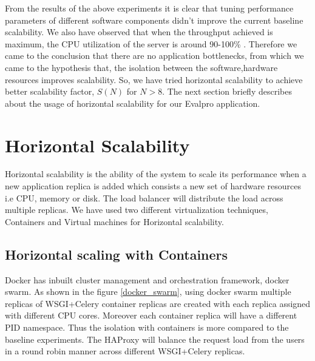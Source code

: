 \documentclass[sigconf]{acmart}
\begin{document}
From the results of the above experiments it is clear that tuning performance parameters of different software components didn't improve the current baseline scalability. We also have observed that when the throughput achieved is maximum, the CPU utilization of the server is around 90-100\% . Therefore we came to the conclusion  that there are no application bottlenecks, from which we came to the hypothesis that, the isolation between the software,hardware resources improves scalability. So, we have tried horizontal scalability to achieve better scalability factor, $S(N)$ for $N>8$.  The next section briefly describes about the usage of horizontal scalability for our Evalpro application.

\section{Horizontal Scalability} \label{horizontal_scalability}
Horizontal scalability is the ability of the system to scale its performance  when a new application replica is added which consists a new set of hardware resources i.e CPU, memory or disk. The load balancer will distribute the load across multiple replicas. We have used two different virtualization techniques, Containers and Virtual machines for Horizontal scalability.
\subsection{Horizontal scaling with Containers}
Docker has inbuilt cluster management and orchestration framework, docker swarm. As shown in the figure \ref{docker_swarm}, using docker swarm multiple replicas of WSGI+Celery container replicas are created with each replica assigned with different CPU cores. Moreover each container replica will have a different PID namespace. Thus the isolation with containers is more compared to the baseline experiments. The HAProxy will balance the request load from the users  in a round robin manner across different WSGI+Celery replicas.
\end{document}

